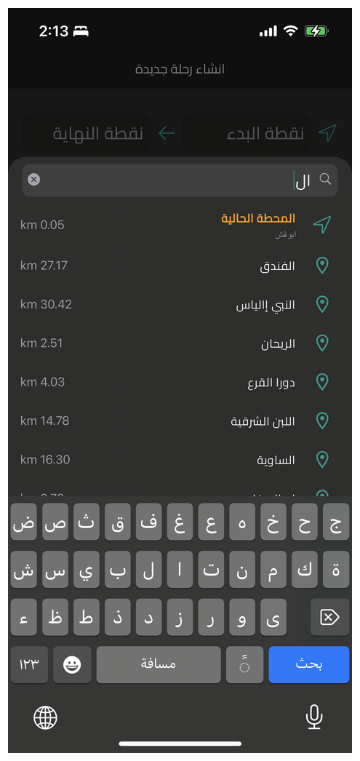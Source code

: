 \documentclass[a4paper, 12pt]{report} %
\begin{document}
            \begin{figure}[H]
                \centering
                \begin{subfigure}{0.3\textwidth}
                    \includegraphics[width=\linewidth]{Images/trip_creation_1.png}

\end{subfigure}
\end{figure}
\end{document}
